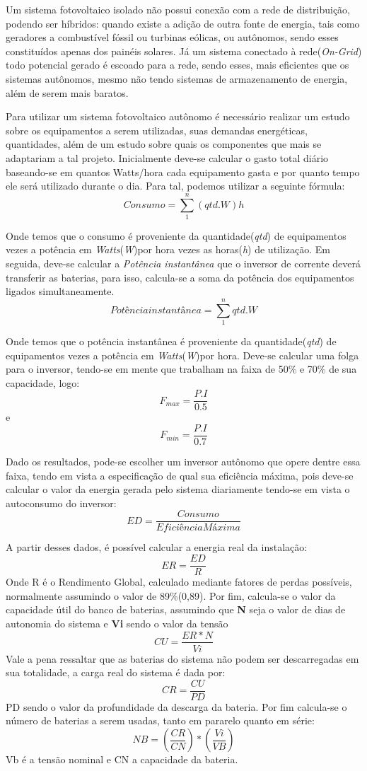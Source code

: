 Um sistema fotovoltaico isolado não possui conexão com a rede de distribuição, podendo ser híbridos: quando existe a adição de outra fonte de energia, tais como geradores a combustível fóssil ou turbinas eólicas, ou autônomos, sendo esses constituídos apenas dos painéis solares. Já um sistema conectado à rede(\textit{On-Grid}) todo potencial gerado é escoado para a rede, sendo esses, mais eficientes que os sistemas autônomos, mesmo não tendo sistemas de armazenamento de energia, além de serem mais baratos.

Para utilizar um sistema fotovoltaico autônomo é necessário realizar um estudo sobre os equipamentos a serem utilizadas, suas demandas energéticas, quantidades, além de um estudo sobre quais os componentes que mais se adaptariam a tal projeto. Inicialmente deve-se calcular o gasto total diário baseando-se em quantos Watts/hora cada equipamento gasta e por quanto tempo ele será utilizado durante o dia. Para tal, podemos utilizar a seguinte fórmula:
\[Consumo = \sum_{1}^{n}\left ( qtd.W \right )h\]

Onde temos que o consumo é proveniente da quantidade(\textit{qtd}) de equipamentos vezes a potência em \textit{Watts}(\textit{W})por hora vezes as horas(\textit{h}) de utilização. Em seguida, deve-se calcular a \textit{Potência instantânea} que o inversor de corrente deverá transferir as baterias, para isso, calcula-se a soma da potência dos equipamentos ligados simultaneamente.
\[Potência instantânea = \sum_{1}^{n} qtd.W  \]

Onde temos que o  potência instantânea é proveniente da quantidade(\textit{qtd}) de equipamentos vezes a potência em \textit{Watts}(\textit{W})por hora. Deve-se calcular uma folga para o inversor, tendo-se em mente que trabalham na faixa de 50\% e 70\% de sua capacidade, logo:
\[F_{max}=\frac{P.I}{0.5}\] e \[F_{min}=\frac{P.I}{0.7}\]

Dado os resultados, pode-se escolher um inversor autônomo que opere dentre essa faixa, tendo em vista a especificação de qual sua eficiência máxima, pois deve-se calcular o valor da energia gerada pelo sistema diariamente tendo-se em vista o autoconsumo do inversor:
\[ED =\frac{Consumo}{Eficiência Máxima}\]

A partir desses dados, é possível calcular a energia real da instalação:
\[ER=\frac{ED}{R}\]
Onde R é o Rendimento Global, calculado mediante fatores de perdas possíveis, normalmente assumindo o valor de 89\%(0,89). Por fim, calcula-se o valor da capacidade útil do banco de baterias, assumindo que \textbf{N} seja o valor de dias de autonomia do sistema e \textbf{Vi} sendo o valor da tensão
\[CU=\frac{ER*N}{Vi}\]
Vale a pena ressaltar que as baterias do sistema não podem ser descarregadas em sua totalidade, a carga real do sistema é dada por: 
\[CR=\frac{CU}{PD}\]
PD sendo o valor da profundidade da descarga da bateria. Por fim calcula-se o número de baterias a serem usadas, tanto em pararelo quanto em série:
\[NB=\left ( \frac{CR}{CN} \right )*\left ( \frac{Vi}{VB} \right )\]
Vb é a tensão nominal e CN a capacidade da bateria.

